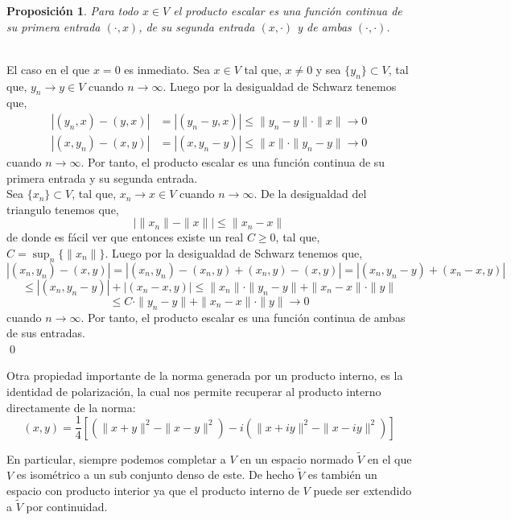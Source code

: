 \documentclass[12pt]{book}
\numberwithin{equation}{chapter}
\newtheorem{proposition}[theorem]{Proposici\'on}
\def\n{\noindent}
\def\rar{\rightarrow}
\begin{document}
\begin{proposition}\label{p1}
Para todo $x \in V$ el producto escalar es una funci\'on continua de su primera entrada $ (\cdot,x) $, de su segunda entrada $(x,\cdot)$ y de ambas $(\cdot , \cdot)$.
\end{proposition}
\n {\bf Demostraci\'on}\\
El caso en el que $x=0$ es inmediato. Sea $ x \in V $ tal que, $x \neq 0$ y sea $\{ y_{n} \} \subset V$, tal que, $ y_{n} \rar y \in V $ cuando $n \rar \infty$. Luego por la desigualdad de Schwarz tenemos que,
\begin{align}
| (y_{n},x)-(y,x) |&=| (y_{n}-y,x) | \leq \| y_{n}-y \| \cdot \|x\| \rar 0 \\
| (x,y_{n})-(x,y) |&=| (x,y_{n}-y) | \leq \|x\| \cdot \| y_{n}-y \| \rar 0
\end{align}
cuando $n \rar \infty$. Por tanto, el producto escalar es una funci\'on continua de su primera entrada y su segunda entrada.\\
Sea $ \{x_{n}\} \subset V $, tal que, $ x_{n} \rar x \in V$ cuando $n \rar \infty$. De la desigualdad del triangulo tenemos que,
$$ \Big| \|x_{n}\| - \|x\| \Big| \leq \| x_{n} - x \| $$
de donde es f\'acil ver que entonces existe un real $C \geq 0$, tal que, $ C= \sup_{n}\{ \|x_{n}\| \} $. Luego por la desigualdad de Schwarz tenemos que,
$$ |(x_{n},y_{n})-(x,y)|= |(x_{n},y_{n})-(x_{n},y)+(x_{n},y)-(x,y)| = |(x_{n},y_{n}-y) + (x_{n}-x,y)|  $$ 
$$ \leq |(x_{n},y_{n}-y)| + |(x_{n}-x,y)| \leq \|x_{n}\|\cdot \|y_{n}-y\|+\|x_{n}-x\| \cdot \|y\| $$
$$ \leq C \cdot \|y_{n}-y\|+\|x_{n}-x\| \cdot \|y\| \rar 0 $$
cuando $n \rar \infty$. Por tanto, el producto escalar es una funci\'on continua de ambas de sus entradas. 
\\ \qed

\vspace{5 mm}

Otra propiedad importante de la norma generada por un producto interno, es la identidad de polarizaci\'on, la cual nos permite recuperar al producto interno directamente de la norma:
\begin{equation}\label{pol-}
(x,y)= \frac{1}{4} \left[ \left( \| x+y \|^{2} -\| x-y \|^{2} \right) -i ( \|x+iy\|^{2} -  \| x-iy \|^{2})  \right]
\end{equation}

En particular, siempre podemos completar a $V$ en un espacio normado $\tilde{V}$ en el que $V$ es isom\'etrico a un sub conjunto denso de este. De hecho $\tilde{V}$ es tambi\'en un espacio con producto interior ya que el producto interno de $V$ puede ser extendido a $\tilde{V}$ por continuidad.  
\end{document}
